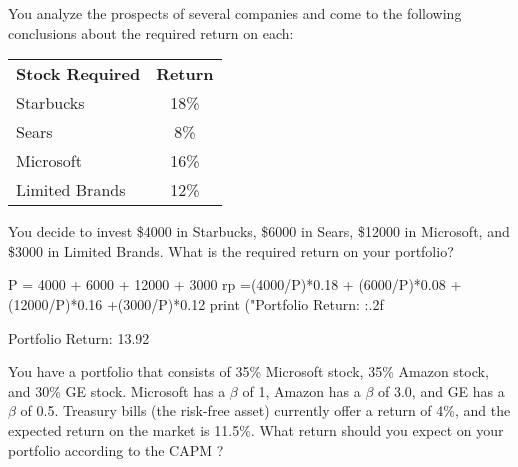 \begin{question}
You analyze the prospects of several companies and come to the following conclusions about the required return on each:

\begin{center}
\begin{tabular}{lc}
\textbf{Stock Required} & \textbf{Return} \\
Starbucks &18\% \\
Sears &8\% \\
Microsoft &16\% \\
Limited Brands &12\% \\
\end{tabular}
\end{center}

You decide to invest \$4000 in Starbucks, \$6000 in Sears, \$12000 in Microsoft, and \$3000 in Limited Brands. What is the required return on your portfolio?
\end{question}

\cprotEnv \begin{solution}
\begin{ipython}
P = 4000 + 6000 + 12000 + 3000
rp =(4000/P)*0.18 + (6000/P)*0.08 + (12000/P)*0.16 +(3000/P)*0.12
print ("Portfolio Return: {:.2f}%
\end{ipython}
\begin{ioutput}
Portfolio Return: 13.92%
\end{ioutput}
\end{solution}	

\begin{question}
You have a portfolio that consists of 35\% Microsoft stock, 35\% Amazon stock, and 30\% GE stock. Microsoft has a $\beta$ of 1, Amazon has a $\beta$ of 3.0, and GE has a $\beta$ of 0.5. Treasury bills (the risk-free asset) currently offer a return of 4\%, and the expected return on the market is 11.5\%. What return should you expect on your portfolio according to the CAPM ? 
\end{question}

